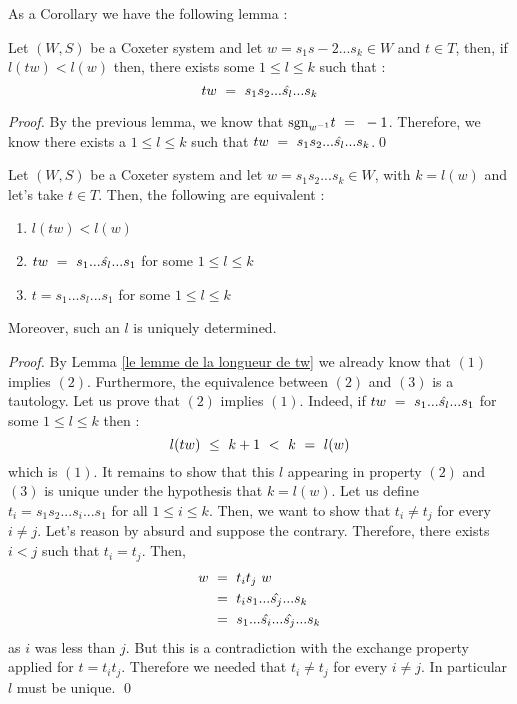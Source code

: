 As a Corollary we have the following lemma :
\begin{lemma}
Let $(W,S)$ be a Coxeter system and let $w=s_1s-2...s_k\in W$ and $t\in T$, then, if $l(tw)<l(w)$ then, there exists some $1\leq l\leq k$ such that :
	\begin{equation}
	tw\text{ }=\text{ } s_1s_2...\hat{s_l}... s_k
	\end{equation}
\end{lemma}
\begin{proof}
	By the previous lemma, we know that $\mbox{sgn}_{w^{-1}}t\text{ }=\text{ } -1$. Therefore, we know there exists a $1\leq l\leq k$ such that $tw\text{ }=\text{ } s_1s_2...\hat{s_l}... s_k$.\qed
\end{proof}
\begin{lemma}
	Let $(W,S)$ be a Coxeter system and let $w=s_1s_2...s_k\in W$, with $k=l(w)$ and let's take $t\in T$. Then, the following are equivalent :
	\begin{enumerate}
		\item $l(tw)<l(w)$
		\item $tw\text{ }=\text{ } s_1...\hat{s_l}...s_1$ for some $1\leq l\leq k$
		\item $t=s_1...s_l...s_1$ for some $1\leq l\leq k$
	\end{enumerate}
Moreover, such an $l$ is uniquely determined.
\end{lemma}
\begin{proof}
	By Lemma \ref{le lemme de la longueur de tw} we already know that $(1)$ implies $(2)$. Furthermore, the equivalence between $(2)$ and $(3)$ is a tautology. Let us prove that $(2)$ implies $(1)$. Indeed, if $tw\text{ }=\text{ } s_1...\hat{s_l}...s_1$ for some $1\leq l\leq k$ then :
	\begin{equation}
	l(tw)\text{ } \leq \text{ } k+1\text{ } <\text{ } k \text{ }=\text{ } l(w)
	\end{equation}
	which is $(1)$. It remains to show that this $l$ appearing in property $(2)$ and $(3)$ is unique under the hypothesis that $k=l(w)$. Let us define $t_i=s_1s_2...s_i...s_1$ for all $1\leq i\leq k$. Then, we want to show that  $t_i\not=t_j$ for every $i\not=j$. Let's reason by absurd and suppose the contrary. Therefore, there exists $i<j$ such that $t_i=t_j$. Then,
	\begin{equation}
	\begin{split}
	w\text{ }&=\text{ } t_it_j\text{ } w\\
	&=\text{ } t_is_1...\hat{s_j}...s_k\\
	&=\text{ } s_1...\hat{s_i}...\hat{s_j}...s_k
	\end{split}
	\end{equation}
	as $i$ was less than $j$. But this is a contradiction with the exchange property applied for $t=t_it_j$. Therefore we needed that $t_i\not=t_j$ for every $i\not=j$. In particular $l$ must be unique.
	\qed
\end{proof}
